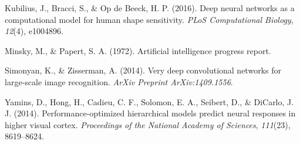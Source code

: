 \documentclass[10pt, letterpaper]{article}
\begin{document}
\hypertarget{ref-kubilius2016deep}{}
Kubilius, J., Bracci, S., \& Op de Beeck, H. P. (2016). Deep neural
networks as a computational model for human shape sensitivity.
\emph{PLoS Computational Biology}, \emph{12}(4), e1004896.

\hypertarget{ref-minsky1972artificial}{}
Minsky, M., \& Papert, S. A. (1972). Artificial intelligence progress
report.

\hypertarget{ref-simonyan2014very}{}
Simonyan, K., \& Zisserman, A. (2014). Very deep convolutional networks
for large-scale image recognition. \emph{ArXiv Preprint
ArXiv:1409.1556}.

\hypertarget{ref-yamins2014performance}{}
Yamins, D., Hong, H., Cadieu, C. F., Solomon, E. A., Seibert, D., \&
DiCarlo, J. J. (2014). Performance-optimized hierarchical models predict
neural responses in higher visual cortex. \emph{Proceedings of the
National Academy of Sciences}, \emph{111}(23), 8619--8624.
\end{document}
